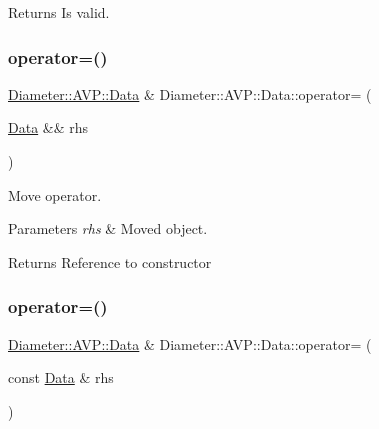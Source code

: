 \begin{DoxyReturn}{Returns}
Is valid. 
\end{DoxyReturn}
\mbox{\label{classDiameter_1_1AVP_1_1Data_ae22c091934eb984ae9f0a03117ac7bf5}} 
\subsubsection{\texorpdfstring{operator=()}{operator=()}\hspace{0.1cm}{\footnotesize\ttfamily [1/2]}}
{\footnotesize\ttfamily \hyperlink{classDiameter_1_1AVP_1_1Data}{Diameter\+::\+A\+V\+P\+::\+Data} \& Diameter\+::\+A\+V\+P\+::\+Data\+::operator= (\begin{DoxyParamCaption}\item[{\hyperlink{classDiameter_1_1AVP_1_1Data}{Data} \&\&}]{rhs }\end{DoxyParamCaption})\hspace{0.3cm}{\ttfamily [noexcept]}}



Move operator. 


\begin{DoxyParams}{Parameters}
{\em rhs} & Moved object. \\
\hline
\end{DoxyParams}
\begin{DoxyReturn}{Returns}
Reference to constructor 
\end{DoxyReturn}
\mbox{\label{classDiameter_1_1AVP_1_1Data_afa01df00dd5cfda793ed683c8c999a86}} 
\subsubsection{\texorpdfstring{operator=()}{operator=()}\hspace{0.1cm}{\footnotesize\ttfamily [2/2]}}
{\footnotesize\ttfamily \hyperlink{classDiameter_1_1AVP_1_1Data}{Diameter\+::\+A\+V\+P\+::\+Data} \& Diameter\+::\+A\+V\+P\+::\+Data\+::operator= (\begin{DoxyParamCaption}\item[{const \hyperlink{classDiameter_1_1AVP_1_1Data}{Data} \&}]{rhs }\end{DoxyParamCaption})}



